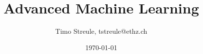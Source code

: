 \documentclass[%
    ,a4paper
    ,fontsize=9.5pt %
    ,landscape
    ,pagesize
    ,headinclude
    ]{scrartcl}
\title{Advanced Machine Learning}
\author{Timo Streule, tstreule@ethz.ch}
\date{\today}
\begin{document}
    

    \begin{multicols*}{4}


        \maketitle

        
        
        
        
        
        
        
        
        
        
        

        

    \end{multicols*}
\end{document}
